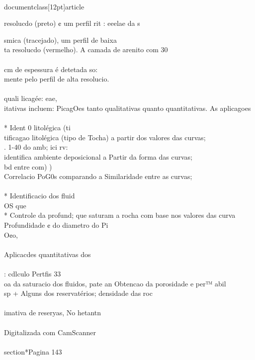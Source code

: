 \\documentclass[12pt]{article}
\begin{document}
resolucdo (preto) ¢ um perfil rit : eeelae da s\\{smica (tracejado), um perfil de baixa\\
ta resolucdo (vermelho). A camada de arenito com 30\\
\\
cm de espessura é detetada so:\\
mente pelo perfil de alta resolucio.\\
\\
quali licagée: eae,\\
itativas incluem: PicagOes tanto qualitativas quanto quantitativas. As aplicagoes\\
\\
* Ident 0 litolégica (ti\\
tificagao litolégica (tipo de Tocha) a partir dos valores das curvas;\\
. 1-40 do amb; ici rv:\\
identifica ambiente deposicional a Partir da forma das curvas;\\
bd entre com) )\\
Correlacio PoG0s comparando a Similaridade entre as curvas;\\
\\
* Identificacio dos fluid\\
OS que\\
* Controle da profund; que saturam a rocha com base nos valores das curva\\
Profundidade ¢ do diametro do Pi\\
O¢o,\\
\\
Aplicacdes quantitativas dos\\
\\
: cdlculo Pertfis 33\\
oa da saturacio dos fluidos, pate an Obtencao da porosidade e per™ abil\\
sp + Alguns dos reservatérios; densidade das roc\\
\\
imativa de reseryas, No hetantn\\
\\
Digitalizada com CamScanner\\

\\section*{Pagina 143}

}
\end{document}
